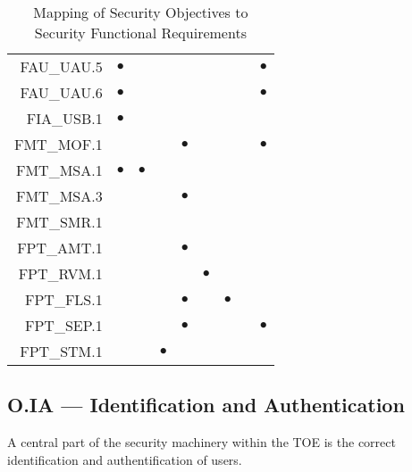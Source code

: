 \documentclass[12pt,english]{scrbook}
\newcommand{\oh}{$\bullet$}
\begin{document}
\begin{table}
\begin{tabular}{rRRRRRRRR}
FAU\_UAU.5                  & \oh  &              &         &           &          &             &              & \oh          \\
FAU\_UAU.6                  & \oh  &              &         &           &          &             &              & \oh          \\
FIA\_USB.1                  & \oh  &              &         &           &          &             &              &              \\
FMT\_MOF.1                  &      &              &         &  \oh      &          &             &              & \oh          \\
FMT\_MSA.1                  & \oh  &  \oh         &         &           &          &             &              &              \\
FMT\_MSA.3                  &      &              &         & \oh       &          &             &              &              \\
FMT\_SMR.1                  &      &              &         &           &          &             &              &              \\
FPT\_AMT.1                  &      &              &         & \oh       &          &             &              &              \\
FPT\_RVM.1                  &      &              &         &           &  \oh     &             &              &              \\
FPT\_FLS.1                  &      &              &         &  \oh      &          &   \oh       &              &              \\
FPT\_SEP.1                  &      &              &         &   \oh     &          &             &              &   \oh        \\
FPT\_STM.1                  &      &              &  \oh    &           &          &             &              &              \\
 \bottomrule
 \end{tabular}
 \caption{Mapping of Security Objectives to Security Functional Requirements}
\end{table}

\subsection{O.IA --- Identification and Authentication}

    A central part of the security machinery within the TOE is the correct
    identification and authentification of users.
\end{document}
